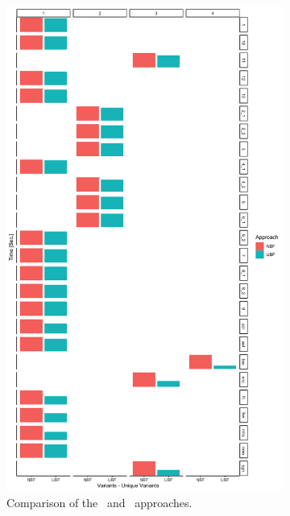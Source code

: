 \begin{figure}[!t]
    \centering
    \begin{subfigure}[t]{0.5\textwidth}
        \centering
        \includegraphics[scale=0.09]{figs/plots/enron-nbf-ubf.png}
        \caption[Comparison of the \nbf\ and \ubf\ approaches]{Comparison of the \nbf\ and \ubf\ approaches.}
        \label{fig:enron-nbf-ubf}
    \end{subfigure}%
    ~ 
    \begin{subfigure}[t]{0.5\textwidth}
        \centering

\end{subfigure}
\end{figure}
